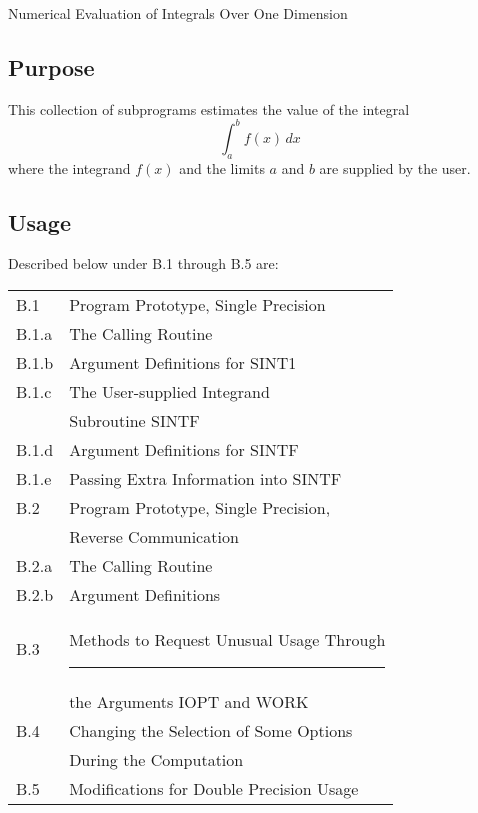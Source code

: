 \documentclass[twoside]{MATH77}
\begin{document}
 Numerical Evaluation of Integrals Over One Dimension


\subsection{Purpose}

This collection of subprograms estimates the value of the integral%
\begin{equation*}
\int_a^bf(x)\,dx
\end{equation*}
where the integrand $f(x)$ and the limits $a$ and $b$ are supplied by the
user.

\subsection{Usage}

Described below under B.1 through B.5 are:

\begin{tabular*}{3.3in}{@{}l@{~~}l}
B.1 & \hspace{-20pt} Program Prototype, Single Precision\dotfill \pageref{PPSP}\\
\quad B.1.a & The Calling Routine\dotfill \pageref{Calling}\\
\quad B.1.b & Argument Definitions for SINT1\dotfill
\pageref{ArgDef}\\
\quad B.1.c & The User-supplied Integrand\\
 & Subroutine SINTF\dotfill
\pageref{SINTF}\\
\quad B.1.d & Argument Definitions for SINTF\dotfill \pageref{ArgSINTF}\\
\quad B.1.e & Passing Extra Information into SINTF\dotfill \pageref{ExSINTF}\\
B.2 & \hspace{-20pt}  Program Prototype, Single Precision,\\
 & \hspace{-20pt} Reverse Communication\dotfill
\pageref{PPRC}\\
\quad B.2.a & The Calling Routine\dotfill \pageref{CallingRC}\\
\quad B.2.b & Argument Definitions\dotfill \pageref{ArgDefRC}\\
B.3 & \hspace{-20pt} Methods to Request Unusual Usage Through
\rule{.3in}{0pt}\\
 & \hspace{-20pt} the Arguments IOPT and WORK\dotfill \pageref{UnusualUse}\\
B.4 & \hspace{-20pt} Changing the Selection of Some Options\\
 &\hspace{-20pt} During the Computation\dotfill \pageref{ChangeSel}\\
B.5 & \hspace{-20pt} Modifications for Double Precision Usage\dotfill \pageref{DPuse}\\
\end{tabular*}
\end{document}
